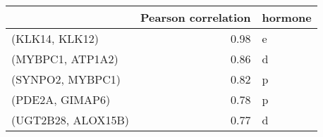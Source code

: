 \begin{tabular}{lrl}
\toprule
{} &  Pearson correlation & hormone \\
\midrule
(KLK14, KLK12)     &         0.98 &       e \\
(MYBPC1, ATP1A2)   &         0.86 &       d \\
(SYNPO2, MYBPC1)   &         0.82 &       p \\
(PDE2A, GIMAP6)    &         0.78 &       p \\
(UGT2B28, ALOX15B) &         0.77 &       d \\
\bottomrule
\end{tabular}
